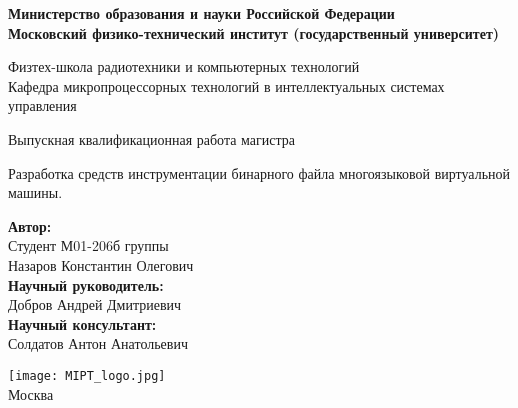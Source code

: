 \begin{center}
    \large\textbf{Министерство образования и науки Российской Федерации \\
    Московский физико-технический институт (государственный
    университет)} \\
    \vspace{1cm}

    Физтех-школа радиотехники и компьютерных технологий \\

    Кафедра микропроцессорных технологий в интеллектуальных системах управления \\

    \vspace{3em}

    Выпускная квалификационная работа магистра
\end{center}

\begin{center}
    \vspace{\fill}
    \LARGE{Разработка средств инструментации бинарного файла многоязыковой виртуальной машины.}

    \vspace{\fill}
\end{center}


\begin{flushright}
    \textbf{Автор:} \\
    Студент М01-206б группы \\
    Назаров Константин Олегович \\
    \vspace{2em}
    \textbf{Научный руководитель:} \\
    Добров Андрей Дмитриевич  \\
    \vspace{2em}
    \textbf{Научный консультант:} \\
    Солдатов Антон Анатольевич \\
\end{flushright}

\vspace{7em}

\begin{center}
    \texttt{[image: MIPT\_logo.jpg]}\\
    Москва \the\year{}
\end{center}

\thispagestyle{empty}

\newpage
\setcounter{page}{2}
\fancyfoot[c]{\thepage}
\fancyhead[R]{}